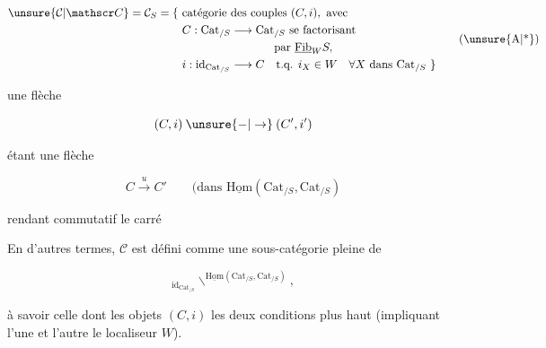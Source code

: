 
\[
\begin{aligned}
\unsure{\mathcal C|\mathscr C}=\mathcal C_S=\{\ &\text{catégorie des couples }(C,i),\ \text{avec}\\
&C:\mathrm{Cat}_{/S}\longrightarrow\mathrm{Cat}_{/S}\ \text{se factorisant}\\
&\hspace{8em}\text{par }\underline{\mathrm{Fib}}_W S,\\
&i:\mathrm{id}_{\mathrm{Cat}_{/S}}\longrightarrow C\quad\text{t.q. }i_X\in W\quad\forall X\ \text{dans }\mathrm{Cat}_{/S}\ \}
\end{aligned}
\tag*{\makebox[0pt][l]{\hspace*{-\displaywidth}(\unsure{A|*})}}
\]

une flèche

\[
(C,i)\mathbin{\unsure{-|\to}}(C',i')
\]

étant une flèche

\[
C\xrightarrow{u}C'\qquad\text{(dans }\underline{\mathrm{Hom}}(\mathrm{Cat}_{/S},\mathrm{Cat}_{/S})
\]

rendant commutatif le carré


En d'autres termes, $\mathcal C$ est défini comme une sous-catégorie pleine de

\[
{}_{\mathrm{id}_{\mathrm{Cat}_{/S}}}\!\backslash^{\underline{\mathrm{Hom}}(\mathrm{Cat}_{/S},\mathrm{Cat}_{/S})},
\]

à savoir celle dont les objets $(C,i)$  les deux conditions  plus haut (impliquant l'une et l'autre le localiseur $W$).
